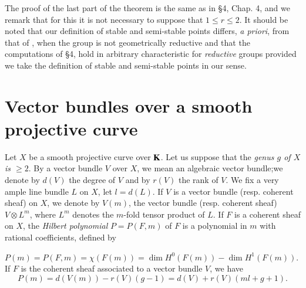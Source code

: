 The proof of the last part of the theorem is the same as in \S4, Chap. 4, \cite{art18-key5} and we remark that for this it is not necessary to suppose that $1\leq r\leq 2$. It should be noted that our definition of stable and semi-stable points differs, {\em a priori}, from that of \cite{art18-key4}, when the group is not geometrically reductive and that the computations of \S4, \cite{art18-key4} hold in arbitrary characteristic for {\em reductive} groups provided we take the definition of stable and semi-stable points in our sense.

\section{Vector bundles over a smooth projective curve}\label{art18-sec3}

Let $X$ be a smooth projective curve over $\mathbf{K}$. Let us suppose that the {\em genus $g$ of $X$ is $\geq 2$}. By a vector bundle $V$ over $X$, we mean an algebraic vector bundle;\pageoriginale we denote by $d(V)$ the degree of $V$ and by $r(V)$ the rank of $V$. We fix a very ample line bundle $L$ on $X$, let $l=d(L)$. If $V$ is a vector bundle (resp. coherent sheaf) on $X$, we denote by $V(m)$, the vector bundle (resp. coherent sheaf) $V\otimes L^{m}$, where $L^{m}$ denotes the $m$-fold tensor product of $L$. If $F$ is a coherent sheaf on $X$, the {\em Hilbert polynomial} $P=P(F,m)$ of $F$ is a polynomial in $m$ with rational coefficients, defined by

$P(m)=P(F,m)=\chi(F(m))=\dim H^{0}(F(m))-\dim H^{1}(F(m))$. If $F$ is the coherent sheaf associated to a vector bundle $V$, we have
$$
P(m)=d(V(m))-r(V)(g-1)=d(V)+r(V)(ml+g+1).
$$

